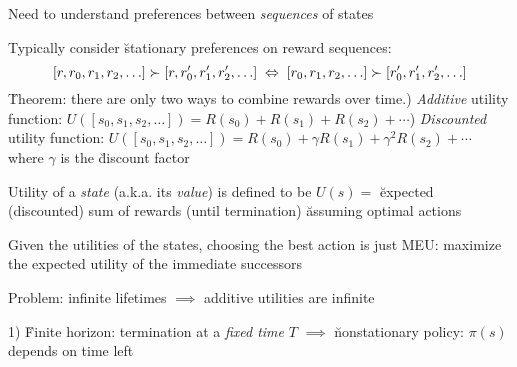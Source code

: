 \documentclass{article}
\begin{document}
\begin{huge}
\vspace*{0.2in}

\textwidth
{}


\vspace*{0.2in}

\textwidth
{}




Need to understand preferences between {\em sequences} of states

Typically consider \u{stationary preferences} on reward sequences:
\[
  [r,r_0,r_1,r_2,\ldots]\mathrel{\succ} [r,r'_0,r'_1,r'_2,\ldots]
  \;\;{\Leftrightarrow}\;\;
  [r_0,r_1,r_2,\ldots]\mathrel{\succ} [r'_0,r'_1,r'_2,\ldots]
\]  
\u{Theorem}: there are only two ways to combine rewards over time.) {\em Additive} utility function:\nl
   $U([s_0,s_1,s_2,\ldots]) = R(s_0) + R(s_1) + R(s_2) + \cdots $) {\em Discounted} utility function:\nl
   $U([s_0,s_1,s_2,\ldots]) = R(s_0) + \gamma R(s_1) + \gamma^2 R(s_2) + \cdots $\nl
   where $\gamma$ is the \u{discount factor}


Utility of a {\em state} (a.k.a. its {\em value}) is defined to be\nl
$U(s) = {}$ \u{expected (discounted) sum of rewards (until termination)}\nl
{} \u{assuming optimal actions}

Given the utilities of the states, choosing the best action is just MEU:\al
  maximize the expected utility of the immediate successors 

\vspace*{0.2in}




Problem: infinite lifetimes $\implies$ additive utilities are infinite

1) \u{Finite horizon}: termination at a {\em fixed time} $T$\al
  $\implies$ \u{nonstationary} policy: $\pi(s)$ depends on time left


\end{huge}
\end{document}
